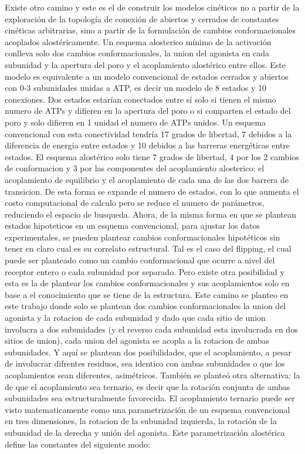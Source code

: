 \documentclass[a4paper,12pt]{article}
\begin{document}
		Existe otro camino y este es el de construir los modelos cinéticos no a partir de la exploración de la topología de conexión de abiertos y cerrados de constantes cinéticas arbitrarias, sino a partir de la formulación de cambios conformacionales acoplados alostéricamente. 
		Un esquema alosterico mínimo de la activación conlleva solo dos cambios conformacionales, la union del agonista en cada subunidad y la apertura del poro y el acoplamiento alostérico entre ellos. Este modelo es equivalente a un modelo convencional de estados cerrados y abiertos con 0-3 subunidades unidas a ATP, es decir un modelo de 8 estados y 10 conexiones. Dos estados estarían conectados entre sí solo si tienen el mismo numero de ATPs y difieren en la apertura del poro o si comparten el estado del poro y solo difieren en 1 unidad el numero de ATPs unidos. Un esquema convencional con esta conectividad tendría 17 grados de libertad, 7 debidos a la diferencia de energia entre estados y 10 debidos a las barreras energéticas entre estados. El esquema alostérico solo tiene 7 grados de libertad, 4 por los 2 cambios de conformacion y 3 por las componentes del acoplamiento alosterico: el acoplamiento de equilibrio y el acoplamiento de cada una de las dos barrera de transicion.  
		De esta forma se expande el numero de estados, con lo que aumenta el costo computacional de calculo pero se reduce el numero de parámetros, reduciendo el espacio de busqueda. 
		Ahora, de la misma forma en que se plantean estados hipoteticos en un esquema convencional, para ajustar los datos experimentales,  se pueden  plantear cambios conformacionales hipotéticos sin tener en claro cual es su correlato estructural. Tal es el caso del flipping, el cual puede ser planteado como un cambio conformacional que ocurre a nivel del receptor entero o cada subunidad por separado. 
		Pero existe otra posibilidad y esta es la de plantear los cambios conformacionales y sus acoplamientos solo en base a el conocimiento que se tiene de la estructura. Este camino se planteo en este trabajo donde solo se plantean  dos cambios conformacionales la union del agonista y la rotacion de cada subunidad y dado que cada sitio de union involucra a dos subunidades (y el reverso cada subunidad esta involucrada en dos sitios de union), cada union del agonista se acopla a la rotacion de ambas subunidades. Y aquí se plantean dos posibilidades, que el acoplamiento, a pesar de involucrar difrentes residuos, sea identico con ambas subunidades o que los acoplamientos sean diferentes, asimétricos. 
		También se planteó otra alternativa: la de que el acoplamiento sea ternario, es decir que la rotación conjunta de ambas subunidades sea estructuralmente favorecida. El acoplamiento ternario puede ser visto matematicamente como una parametrización de un esquema convencional en tres dimensiones, la rotacion de la subunidad izquierda, la rotación de la subunidad de la derecha y unión del agonista. Este parametrización alostérica define las constantes del siguiente modo: 
	
\end{document}
